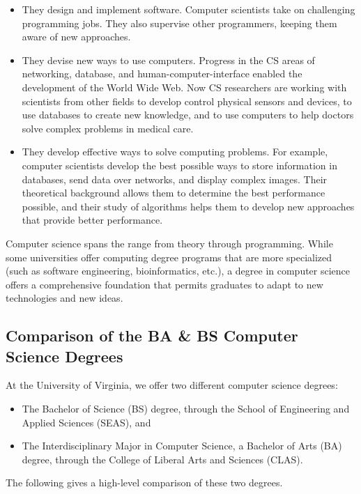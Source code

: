 \documentclass[10pt,letter,twocolumn]{book}
\newenvironment{itemlist}{
\begin{itemize}
\setlength{\itemsep}{0pt}
\setlength{\parskip}{0pt}}
{\end{itemize}}
\begin{document}
\begin{itemlist}
\item They design and implement software. Computer scientists take on
  challenging programming jobs. They also supervise other programmers,
  keeping them aware of new approaches.
\item They devise new ways to use computers. Progress in the CS areas
  of networking, database, and human-computer-interface enabled the
  development of the World Wide Web. Now CS researchers are working
  with scientists from other fields to develop control physical
  sensors and devices, to use databases to create new knowledge, and
  to use computers to help doctors solve complex problems in medical
  care.
\item They develop effective ways to solve computing problems. For
  example, computer scientists develop the best possible ways to store
  information in databases, send data over networks, and display
  complex images. Their theoretical background allows them to
  determine the best performance possible, and their study of
  algorithms helps them to develop new approaches that provide better
  performance.
\end{itemlist}

Computer science spans the range from theory through
programming. While some universities offer computing degree programs
that are more specialized (such as software engineering,
bioinformatics, etc.), a degree in computer science offers a
comprehensive foundation that permits graduates to adapt to new
technologies and new ideas.

\subsection{Comparison of the BA \& BS Computer Science
  Degrees}

At the University of Virginia, we offer two different computer science
degrees:

\begin{itemlist}
\item The Bachelor of Science (BS) degree, through the School of
  Engineering and Applied Sciences (SEAS), and
\item The Interdisciplinary Major in Computer Science, a Bachelor of
  Arts (BA) degree, through the College of Liberal Arts and Sciences
  (CLAS).
\end{itemlist}

The following gives a high-level comparison of these two degrees.
\end{document}
